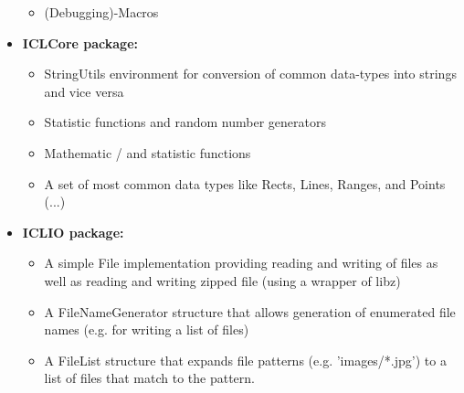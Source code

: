 \begin{itemize}
\begin{itemize}
        \item (Debugging)-Macros \\
\end{itemize}

\item \textbf{ICLCore package:} \\
\begin{itemize}
        \item StringUtils environment for conversion of common data-types into strings and vice versa\\

        \item Statistic functions and random number generators\\

        \item Mathematic / and statistic functions\\

        \item A set of most common data types like Rects, Lines, Ranges, and Points \\
            
            (...)

\end{itemize}

\item \textbf{ICLIO package:} \\
\begin{itemize}
        \item A simple File implementation providing reading and writing of files as well as reading and writing zipped file (using a wrapper of libz)\\
        
        \item A FileNameGenerator structure that allows generation of enumerated file names (e.g. for writing a list of files)\\

        \item A FileList structure that expands file patterns (e.g. 'images/*.jpg') to a list of files that match to the pattern.\\
\end{itemize}



\end{itemize}
